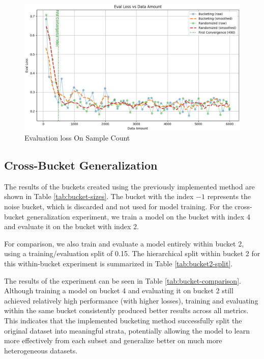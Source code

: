 \documentclass[twocolumn]{article}
\newcounter{ex}
\renewcommand{\indent}{\hspace*{2em}}
\begin{document}
\begin{figure}[H]
    \centering
    \includegraphics[width=\linewidth]{loss-count-2.eps}
    \caption{Evaluation loss On Sample Count}
    \label{fig:loss-count}
\end{figure}

\subsection{Cross-Bucket Generalization}

\indent The results of the buckets created using the previously implemented method are shown in Table \ref{tab:bucket-sizes}. The bucket with the index $-1$ represents the noise bucket, which is discarded and not used for model training. For the cross-bucket generalization experiment, we train a model on the bucket with index 4 and evaluate it on the bucket with index 2. 

\indent For comparison, we also train and evaluate a model entirely within bucket 2, using a training/evaluation split of 0.15. The hierarchical split within bucket 2 for this within-bucket experiment is summarized in Table \ref{tab:bucket2-split}.

\indent The results of the experiment can be seen in Table \ref{tab:bucket-comparison}. Although training a model on bucket 4 and evaluating it on bucket 2 still achieved relatively high performance (with higher losses), training and evaluating within the same bucket consistently produced better results across all metrics. This indicates that the implemented bucketing method successfully split the original dataset into meaningful strata, potentially allowing the model to learn more effectively from each subset and generalize better on much more heterogeneous datasets.
\end{document}
